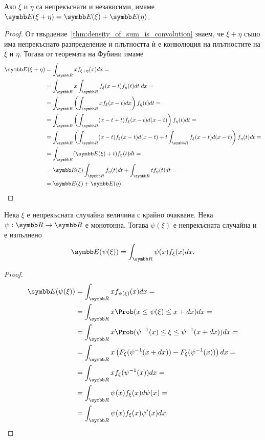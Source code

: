 \documentclass[numbers=endperiod, bibliography=totocnumbered]{scrartcl}
\begin{document}
\begin{proposition}\label{thm:expectation_is_additive}
  Ако \( \xi \) и \( \eta \) са непрекъснати и независими, имаме \( \Expect(\xi + \eta) = \Expect(\xi) + \Expect(\eta) \).
\end{proposition}
\begin{proof}
  От твърдение~\ref{thm:density_of_sum_is_convolution} знаем, че \( \xi + \eta \) също има непрекъснато разпределение и плътността ѝ е конволюция на плътностите на \( \xi \) и \( \eta \). Тогава от теоремата на Фубини имаме
  \begin{align*}
    \Expect(\xi + \eta)
    &=
    \int_{\R} x f_{\xi + \eta} (x) dx
    = \\ &=
    \int_{\R} x \int_{\R} f_\xi(x - t) f_\eta(t) dt \; dx
    = \\ &=
    \int_{\R} \left( \int_{\R} x f_\xi(x - t) dx \right) f_\eta(t) dt
    = \\ &=
    \int_{\R} \left( \int_{\R} (x - t + t) f_\xi(x - t) d(x - t) \right) f_\eta(t) dt
    = \\ &=
    \int_{\R} \left( \int_{\R} (x - t) f_\xi(x - t) d(x - t) + t \int_{\R} f_\xi(x - t) d(x - t) \right) f_\eta(t) dt
    = \\ &=
    \int_{\R} (\Expect(\xi) + t) f_\eta(t) dt
    = \\ &=
    \Expect(\xi) \int_{\R} f_\eta(t) dt + \int_{\R} t f_\eta(t) dt
    = \\ &=
    \Expect(\xi) + \Expect(\eta).
  \end{align*}
\end{proof}

\begin{proposition}\label{thm:lotus}
  Нека \( \xi \) е непрекъсната случайна величина с крайно очакване. Нека \( \psi: \R \to \R \) е монотонна. Тогава \( \psi(\xi) \) е непрекъсната случайна и е изпълнено
  \begin{equation*}
    \Expect(\psi(\xi))
    =
    \int_{\R} \psi(x) f_\xi(x) dx.
  \end{equation*}
\end{proposition}

\begin{proof}
  \begin{align*}
    \Expect(\psi(\xi))
    &=
    \int_{\R} x f_{\psi(\xi)}(x) dx
    = \\ &=
    \int_{\R} x \Prob(x \leq \psi(\xi) \leq x + dx) dx
    = \\ &=
    \int_{\R} x \Prob(\psi^{-1}(x) \leq \xi \leq \psi^{-1}(x + dx)) dx
    = \\ &=
    \int_{\R} x \left( F_\xi(\psi^{-1}(x + dx)) - F_\xi(\psi^{-1}(x)) \right) dx
    = \\ &=
    \int_{\R} x f_\xi(\psi^{-1}(x)) dx
    = \\ &=
    \int_{\R} \psi(x) f_\xi(x) d \psi(x)
    = \\ &=
    \int_{\R} \psi(x) f_\xi(x) \psi'(x) dx.
  \end{align*}
\end{proof}
\end{document}
